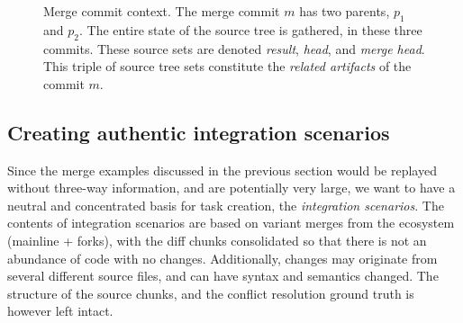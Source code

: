 \begin{figure}[h]
    \centering
    \caption{Merge commit context. The merge commit $m$ has two parents, $p_1$ and $p_2$. The entire state of the source tree is gathered, in these three commits. These source sets are denoted \textit{result}, \textit{head}, and \textit{merge head}. This triple of source tree sets constitute the \textit{related artifacts} of the commit $m$.}
    \label{intentions:mergespace}
\end{figure}

\subsection{Creating authentic integration scenarios}
Since the merge examples discussed in the previous section would be replayed without three-way information, and are potentially very large, we want to have a neutral and concentrated basis for task creation, the \textit{integration scenarios}. The contents of integration scenarios are based on variant merges from the ecosystem (mainline + forks), with the diff chunks consolidated so that there is not an abundance of code with no changes. Additionally, changes may originate from several different source files, and can have syntax and semantics changed. The structure of the source chunks, and the conflict resolution ground truth is however left intact.

